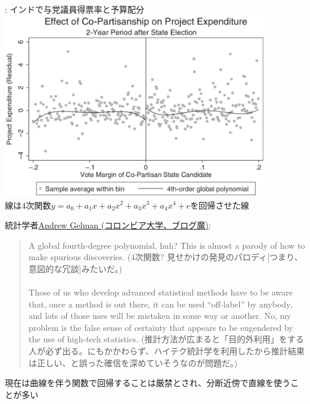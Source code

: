 \begin{frame}{}
\citet{Bohlken2018}: インドで与党議員得票率と予算配分\\
\hfil\includegraphics[height = 8cm]{ImpactEvaluation/figure/RDD_BadIndiaCoPartisanship.png}\\
線は4次関数$y=a_{0}+a_{1}x+a_{2}x^{2}+a_{3}x^{3}+a_{4}x^{4}+e$を回帰させた線
\end{frame}

\begin{frame}{}
統計学者\href{https://statmodeling.stat.columbia.edu/author/andrew/}{Andrew Gelman (コロンビア大学、ブログ魔)}:

\begin{quotation}
A global fourth-degree polynomial, huh? This is almost a parody of how to make spurious discoveries. (4次関数? 見せかけの発見のパロディ[つまり、意図的な冗談]みたいだ。)\\~\\

\pause
Those of us who develop advanced statistical methods have to be aware that, once a method is out there, it can be used ``off-label'' by anybody, and lots of those uses will be mistaken in some way or another. No, my problem is the false sense of certainty that appears to be engendered by the use of high-tech statistics. (推計方法が広まると「目的外利用」をする人が必ず出る。にもかかわらず、ハイテク統計学を利用したから推計結果は正しい、と誤った確信を深めていそうなのが問題だ。)
\end{quotation}
\vspace{2ex}
\pause
現在は曲線を伴う関数で回帰することは厳禁とされ、分断近傍で直線を使うことが多い\\
\hfill{}
\end{frame}

